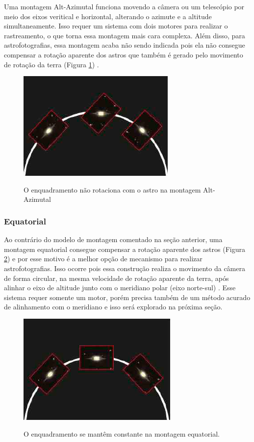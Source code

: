 Uma montagem Alt-Azimutal funciona movendo a câmera ou um telescópio por meio dos eixos veritical e horizontal, alterando o azimute e a altitude simultaneamente. Isso requer um sistema com dois motores para realizar o rastreamento, o que torna essa montagem mais cara complexa. Além disso, para astrofotografias, essa montagem acaba não sendo indicada pois ela não consegue compensar a rotação aparente dos astros que também é gerado pelo movimento de rotação da terra (Figura \ref{fig:altazimuterotation}) \cite{book:bbcsky}. 

\begin{figure}[!htb]
	\centering
	\caption{O enquadramento não rotaciona com o astro na montagem Alt-Azimutal}
	\includegraphics[width=0.45\linewidth]{figuras/altazimuterotation}
	\label{fig:altazimuterotation}
\end{figure}

\subsubsection{Equatorial}

Ao contrário do modelo de montagem comentado na seção anterior, uma montagem equatorial consegue compensar a rotação aparente dos astros (Figura \ref{fig:equatorialrotation}) e por esse motivo é a melhor opção de mecanismo para realizar astrofotografias. Isso ocorre pois essa construção realiza o movimento da câmera de forma circular, na mesma velocidade de rotação aparente da terra, após alinhar o eixo de altitude junto com o meridiano polar (eixo norte-sul) \cite{book:bbcsky}. Esse sistema requer somente um motor, porém precisa também de um método acurado de alinhamento com o meridiano e isso será explorado na próxima seção. 

\begin{figure}[!htb]
	\centering
	\caption{O enquadramento se mantêm constante na montagem equatorial.}
	\includegraphics[width=0.45\linewidth]{figuras/equatorialrotation}
	\label{fig:equatorialrotation}
\end{figure}

